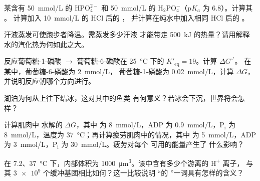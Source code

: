 \begin{exercise}[$\star\star$]\label{exo:b1:water-small-molecules:6}
某含有 \qty{50}{mmol/L} 的 $\mathrm{HPO_4^{2-}}$ 和
\qty{50}{mmol/L} 的 $\mathrm{H_2PO_4^-}$（p$K_a$ 为 6.8）。计算其 。
计算加入 \qty{10}{mmol/L} 的 HCl 后的 ，
并计算在纯水中加入相同 HCl 后的 。
\end{exercise}

\begin{exercise}[$\star\star$]\label{exo:b1:water-small-molecules:7}
汗液蒸发可使跑步者降温。需蒸发多少汗液
才能带走 \qty{500}{kJ} 的热量？请用解释
水的汽化热为何如此之大。
\end{exercise}

\begin{exercise}[$\star\star$]\label{exo:b1:water-small-molecules:8}
反应葡萄糖-1-磷酸 $\to$ 葡萄糖-6-磷酸在 \qty{25}{\celsius} 下的
$K'_{\text{eq}} = 19$。计算 $\Delta G^{\circ\prime}$。
在某中，葡萄糖-6-磷酸为 \qty{2}{mmol/L}，
葡萄糖-1-磷酸为 \qty{0.02}{mmol/L}，计算
$\Delta G$，并说明反应朝哪个方向进行。
\end{exercise}

\begin{exercise}[$\star\star$]\label{exo:b1:water-small-molecules:9}
湖泊为何从上往下结冰，这对其中的鱼类
有何意义？若冰会下沉，世界将会怎样？
\end{exercise}

\begin{exercise}[$\star\star\star$]\label{exo:b1:water-small-molecules:10}
计算肌肉中  水解的 $\Delta G$，其中  为
\qty{8}{mmol/L}，ADP 为 \qty{0.9}{mmol/L}，$\mathrm{P_i}$ 为
\qty{8}{mmol/L}，温度为 \qty{37}{\celsius}；再计算疲劳肌肉中的情况，其中  为
\qty{5}{mmol/L}，ADP 为 \qty{3}{mmol/L}，$\mathrm{P_i}$ 为
\qty{30}{mmol/L}。疲劳对每个  可用的能量产生了
什么影响？
\end{exercise}

\begin{exercise}[$\star\star\star$]\label{exo:b1:water-small-molecules:11}
在  7.2、\qty{37}{\celsius} 下，内部体积为
\qty{1000}{\micro m^3}。该中含有多少个游离的 $\mathrm{H^+}$ 离子，
与其 $\num{3e9}$ 个缓冲基团相比如何？这一比较说明
“的 ”一词具有怎样的含义？
\end{exercise}

